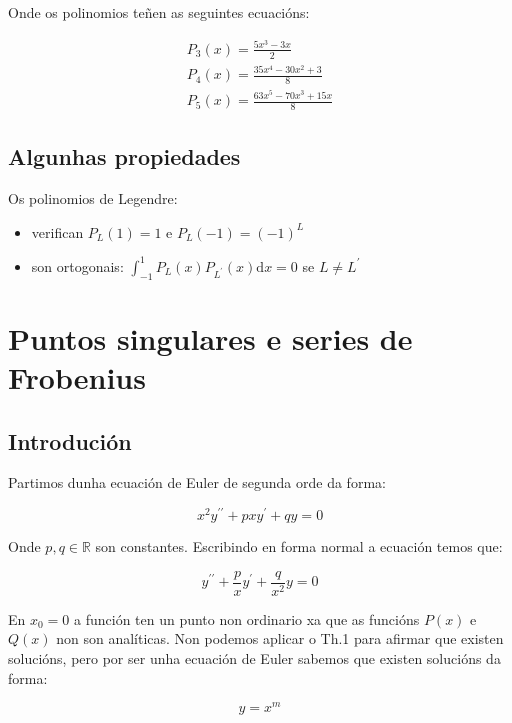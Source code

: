 \documentclass[a4paper,12pt,titlepage]{article}
\begin{document}
Onde os polinomios teñen as seguintes ecuacións:

\begin{equation*}
    \begin{gathered}
        P_3(x)= \frac{5x^3-3x}{2} \\
        P_4(x) = \frac{35x^4-30x^2+3}{8}\\
        P_5(x) = \frac{63x^5-70x^3+15x}{8}
    \end{gathered}
\end{equation*}

\subsection{Algunhas propiedades}
Os polinomios de Legendre:

\begin{itemize}
  \item verifican $P_{L}(1)=1$ e $P_{L}(-1)=(-1)^{L}$
  \item son ortogonais: $\int_{-1}^{1} P_{L}(x) P_{L^{\prime}}(x) \mathrm{d} x=0$ se $L \neq L^{\prime}$
\end{itemize}

\section{Puntos singulares e series de Frobenius}

\subsection{Introdución}
Partimos dunha ecuación de Euler de segunda orde da forma:

\begin{equation*}
    x^2 y^{\prime \prime}+p x y^{\prime}+q y=0
\end{equation*}

Onde $p,q \in \mathbb{R}$ son constantes. Escribindo en forma normal a ecuación temos que:

\begin{equation*}
    y^{\prime \prime}+\frac{p}{x} y^{\prime}+\frac{q}{x^{2}} y=0
\end{equation*}

En $x_0=0$ a función ten un punto non ordinario xa que as funcións $P(x)$ e $Q(x)$ non son analíticas. Non podemos aplicar o Th.1 para afirmar que existen solucións, pero por ser unha ecuación de Euler sabemos que existen solucións da forma:

\begin{equation*}
    y = x^m
\end{equation*}
\end{document}
